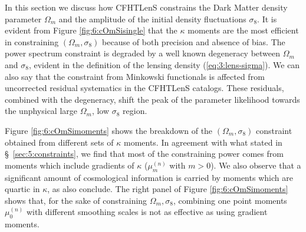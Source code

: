 In this section we discuss how CFHTLenS constrains the Dark Matter density parameter $\Omega_m$ and the amplitude of the initial density fluctuations $\sigma_8$. It is evident from Figure \ref{fig:6:cOmSisingle} that the $\kappa$ moments are the most efficient in constraining $(\Omega_m,\sigma_8)$ because of both precision and absence of bias. The power spectrum constraint is degraded by a well known degeneracy between $\Omega_m$ and $\sigma_8$, evident in the definition of the lensing density (\ref{eq:3:lens-sigma}). We can also say that the constraint from Minkowski functionals is affected from uncorrected residual systematics in the CFHTLenS catalogs. These residuals, combined with the degeneracy, shift the peak of the parameter likelihood towards the unphysical large $\Omega_m$, low $\sigma_8$ region. 

Figure \ref{fig:6:cOmSimoments} shows the breakdown of the $(\Omega_m,\sigma_8)$ constraint obtained from different sets of $\kappa$ moments. In agreement with what stated in \S~\ref{sec:5:constraints}, we find that most of the constraining power comes from moments which include gradients of $\kappa$ ($\mu_{m}^{(n)}$ with $m>0$). We also observe that a significant amount of cosmological information is carried by moments which are quartic in $\kappa$, as \citep{JainKurt} also conclude. The right panel of Figure \ref{fig:6:cOmSimoments} shows that, for the sake of constraining $\Omega_m,\sigma_8$, combining one point moments $\mu_0^{(n)}$ with different smoothing scales is not as effective as using gradient moments.  


